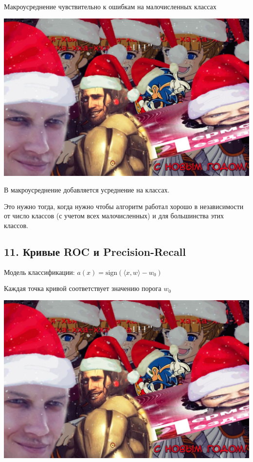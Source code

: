 Макроусреднение чувствительно к ошибкам на малочисленных классах

\includegraphics[scale=0.3]{figures/samplefigure.jpg}

В макроусреднение добавляется усреднение на классах.

Это нужно тогда, когда нужно чтобы алгоритм работал хорошо в независимости
от число классов (с учетом всех малочисленных) и для большинства этих
классов.

\subsection{11. Кривые ROC и Precision-Recall}

Модель классификации: $a{(x)} = \text{sign}{\left( {\langle x, w \rangle} - w_0 \right)}$

Каждая точка кривой соответствует значению порога $w_0$

\includegraphics[scale=0.3]{figures/samplefigure.jpg}

